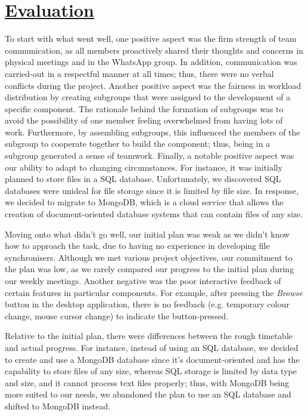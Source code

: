 \documentclass{article}
\begin{document}
\section{\underline{Evaluation}}
To start with what went well, one positive aspect was the firm strength of team communication, as all members proactively shared their thoughts and concerns in physical meetings and in the WhatsApp group. In addition, communication was carried-out in a respectful manner at all times; thus, there were no verbal conflicts during the project. Another positive aspect was the fairness in workload distribution by creating subgroups that were assigned to the development of a specific component. The rationale behind the formation of subgroups was to avoid the possibility of one member feeling overwhelmed from having lots of work. Furthermore, by assembling subgroups, this influenced the members of the subgroup to cooperate together to build the component; thus, being in a subgroup generated a sense of teamwork. Finally, a notable positive aspect was our ability to adapt to changing circumstances. For instance, it was initially planned to store files in a SQL database. Unfortunately, we discovered SQL databases were unideal for file storage since it is limited by file size. In response, we decided to migrate to MongoDB, which is a cloud service that allows the creation of document-oriented database systems that can contain files of any size.

\noindent Moving onto what didn't go well, our initial plan was weak as we didn't know how to approach the task, due to having no experience in developing file synchronisers. Although we met various project objectives, our commitment to the plan was low, as we rarely compared our progress to the initial plan during our weekly meetings. Another negative was the poor interactive feedback of certain features in particular components. For example, after pressing the \textit{Browse} button in the desktop application, there is no feedback (e.g. temporary colour change, mouse cursor change) to indicate the button-pressed.

\noindent Relative to the initial plan, there were differences between the rough timetable and actual progress. For instance, instead of using an SQL database, we decided to create and use a MongoDB database since it's document-oriented and has the capability to store files of any size, whereas SQL storage is limited by data type and size, and it cannot process text files properly; thus, with MongoDB being more suited to our needs, we abandoned the plan to use an SQL database and shifted to MongoDB instead.
\end{document}
